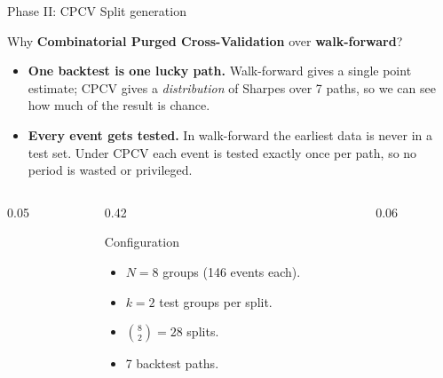 \documentclass[aspectratio=169, t]{beamer}
\begin{document}
\begin{frame}{Phase II: CPCV Split generation}
\vspace{-0.6em}

{
\begin{block}{Why \textbf{Combinatorial Purged Cross-Validation} over \textbf{walk-forward}?}
\footnotesize
\begin{itemize}\setlength{\itemsep}{4pt}
  \item \textbf{One backtest is one lucky path.} Walk-forward gives a single point estimate; CPCV gives a \emph{distribution} of Sharpes over 7 paths, so we can see how much of the result is chance.
  \item \textbf{Every event gets tested.} In walk-forward the earliest data is never in a test set. Under CPCV each event is tested exactly once per path, so no period is wasted or privileged.
\end{itemize}
\end{block}
}

\vspace{0.6em}

\begin{columns}[T]
\begin{column}{0.05\textwidth}\hfill\end{column}

\begin{column}{0.42\textwidth}
{
\begin{block}{Configuration}
\footnotesize
\begin{itemize}\setlength{\itemsep}{2pt}
  \item $N = 8$ groups (146 events each).
  \item $k = 2$ test groups per split.
  \item $\binom{8}{2} = 28$ splits.
  \item 7 backtest paths.
\end{itemize}
\end{block}
}
\end{column}

\begin{column}{0.06\textwidth}\hfill\end{column}


\end{columns}
\end{frame}
\end{document}
